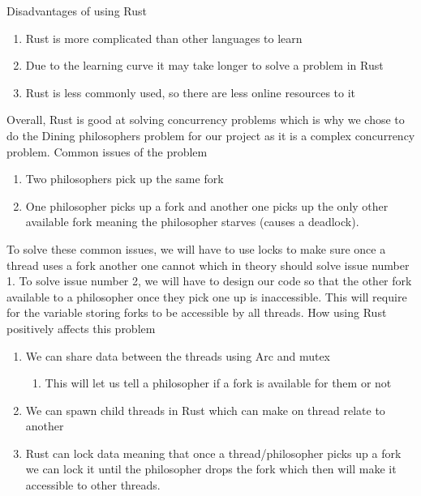 \documentclass[conference]{IEEEtran}
\begin{document}
	Disadvantages of using Rust
	\begin{enumerate}
		\item Rust is more complicated than other languages to learn
		\item Due to the learning curve it may take longer to solve a problem in Rust
		\item Rust is less commonly used, so there are less online resources to it
	\end{enumerate}
	Overall, Rust is good at solving concurrency problems which is why we chose to do the Dining philosophers problem for our project as it is a complex concurrency problem. 
	\linebreak
	\linebreak
	Common issues of the problem
	\begin{enumerate}
		\item Two philosophers pick up the same fork
		\item One philosopher picks up a fork and another one picks up the only other available fork meaning the philosopher starves (causes a deadlock).
	\end{enumerate}
	To solve these common issues, we will have to use locks to make sure once a thread uses a fork another one cannot which in theory should solve issue number 1. To solve issue number 2, we will have to design our code so that the other fork available to a philosopher once they pick one up is inaccessible. This will require for the variable storing forks to be accessible by all threads.
	\linebreak
	\linebreak
	How using Rust positively affects this problem
	\begin{enumerate}
		\item We can share data between the threads using Arc and mutex
		\begin{enumerate}
			
			\item This will let us tell a philosopher if a fork is available for them or not
		\end{enumerate}
		\item We can spawn child threads in Rust which can make on thread relate to another
		\item Rust can lock data meaning that once a thread/philosopher picks up a fork we can lock it until the philosopher drops the fork which then will make it accessible to other threads.
	\end{enumerate}
\end{document}
